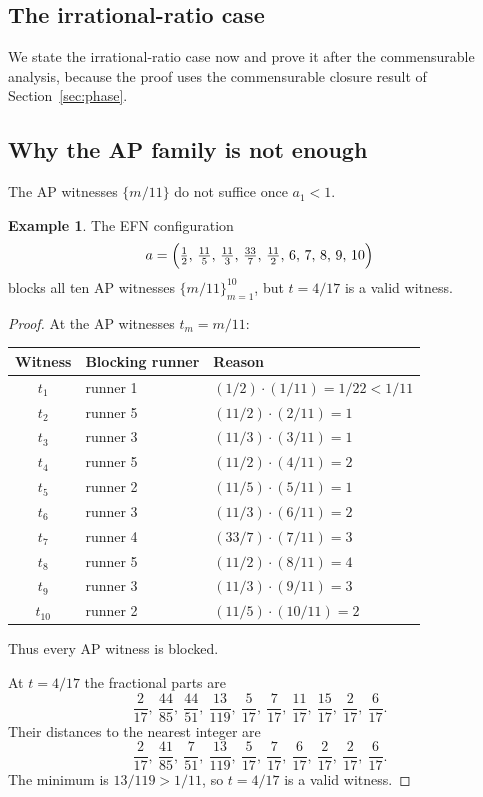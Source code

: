 \documentclass[12pt,a4paper]{amsart}
\theoremstyle{definition}
\newtheorem{example}[theorem]{Example}
\theoremstyle{remark}
\begin{document}
\subsection{The irrational-ratio case}

We state the irrational-ratio case now and prove it after the commensurable analysis,
because the proof uses the commensurable closure result of Section~\ref{sec:phase}.

\subsection{Why the AP family is not enough}

The AP witnesses $\{m/11\}$ do not suffice once $a_1<1$.

\begin{example}\label{ex:ap-fail}
The EFN configuration
\[
  a = \Bigl(\tfrac{1}{2},\,\tfrac{11}{5},\,\tfrac{11}{3},\,\tfrac{33}{7},\,\tfrac{11}{2},
             \,6,\,7,\,8,\,9,\,10\Bigr)
\]
blocks all ten AP witnesses $\{m/11\}_{m=1}^{10}$, but $t=4/17$ is a valid witness.
\end{example}

\begin{proof}
At the AP witnesses $t_m=m/11$:

\medskip
\begin{center}
\begin{tabular}{cll}
\toprule
Witness & Blocking runner & Reason \\
\midrule
$t_1$ & runner 1 & $(1/2)\cdot(1/11)=1/22<1/11$ \\
$t_2$ & runner 5 & $(11/2)\cdot(2/11)=1$ \\
$t_3$ & runner 3 & $(11/3)\cdot(3/11)=1$ \\
$t_4$ & runner 5 & $(11/2)\cdot(4/11)=2$ \\
$t_5$ & runner 2 & $(11/5)\cdot(5/11)=1$ \\
$t_6$ & runner 3 & $(11/3)\cdot(6/11)=2$ \\
$t_7$ & runner 4 & $(33/7)\cdot(7/11)=3$ \\
$t_8$ & runner 5 & $(11/2)\cdot(8/11)=4$ \\
$t_9$ & runner 3 & $(11/3)\cdot(9/11)=3$ \\
$t_{10}$ & runner 2 & $(11/5)\cdot(10/11)=2$ \\
\bottomrule
\end{tabular}
\end{center}

\medskip\noindent
Thus every AP witness is blocked.

At $t=4/17$ the fractional parts are
\[
  \frac{2}{17},\ \frac{44}{85},\ \frac{44}{51},\ \frac{13}{119},\ \frac{5}{17},\
  \frac{7}{17},\ \frac{11}{17},\ \frac{15}{17},\ \frac{2}{17},\ \frac{6}{17}.
\]
Their distances to the nearest integer are
\[
  \frac{2}{17},\ \frac{41}{85},\ \frac{7}{51},\ \frac{13}{119},\ \frac{5}{17},\
  \frac{7}{17},\ \frac{6}{17},\ \frac{2}{17},\ \frac{2}{17},\ \frac{6}{17}.
\]
The minimum is $13/119>1/11$, so $t=4/17$ is a valid witness.
\end{proof}
\end{document}
